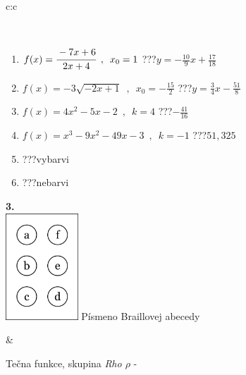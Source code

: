 \documentclass[10pt]{report}
\begin{document}
\begin{tabular}{c:c}
\begin{minipage}[c][104.5mm][t]{0.5\linewidth}
\begin{center}
\begin{minipage}{0.95\linewidth}
\end{minipage}
\\[1mm]
\begin{minipage}{0.79\linewidth}
\begin{center}
\begin{varwidth}{\linewidth}
\begin{enumerate}
\small
\item $f(x)=\cfrac{-7x+6}{2x+4}\enspace , \enspace x_0=1$\quad \dotfill\; ???\;\dotfill \quad $y = -\frac{10}{9}x+\frac{17}{18}$
\item $f(x)=-3\sqrt{-2x+1}\enspace , \enspace x_0=-\frac{15}{2}$\quad \dotfill\; ???\;\dotfill \quad $y = \frac{3}{4}x-\frac{51}{8}$
\item $f(x)=4x^2-5x-2\enspace , \enspace k=4$\quad \dotfill\; ???\;\dotfill \quad $-\frac{41}{16}$
\item $f(x)=x^3-9x^2-49x-3\enspace , \enspace k=-1$\quad \dotfill\; ???\;\dotfill \quad $51 , 325$
\item \quad \dotfill\; ???\;\dotfill \quad vybarvi
\item \quad \dotfill\; ???\;\dotfill \quad nebarvi
\end{enumerate}
\end{varwidth}
\end{center}
\end{minipage}
\begin{minipage}{0.20\linewidth}
\begin{center}
{\Huge\bfseries 3.} \\[2mm]
\includegraphics[height=40mm]{../images/braille.png}
{\small Písmeno Braillovej abecedy}
\end{center}
\end{minipage}
\end{center}
\end{minipage}
&
\begin{minipage}[c][104.5mm][t]{0.5\linewidth}
\begin{center}
\vspace{7mm}
{\huge Tečna funkce, skupina \textit{Rho $\rho$} -}\\[5mm]

\end{center}
\end{minipage}
\end{tabular}
\end{document}
